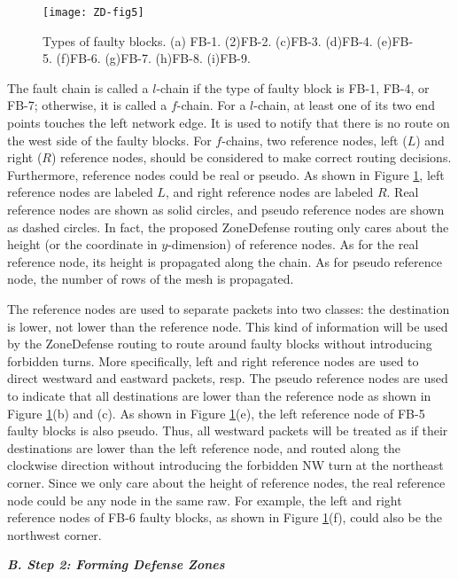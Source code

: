 \begin{figure}[h]
    \centering
        \texttt{[image: ZD-fig5]}
          \caption{Types of faulty blocks. (a) FB-1. (2)FB-2. (c)FB-3. (d)FB-4. (e)FB-5. (f)FB-6. (g)FB-7. (h)FB-8. (i)FB-9.}
        \label{fig:ZD-fig5}
\end{figure}


The fault chain is called a $l$-chain if the type of faulty block is FB-1, FB-4, or FB-7; otherwise, it is called a $f$-chain. For a $l$-chain, at least one of its two end points touches the left network edge. It is used to notify that there is no route on the west side of the faulty blocks. For $f$-chains, two reference nodes, left ($L$) and right ($R$) reference nodes, should be considered to make correct routing decisions. Furthermore, reference nodes could be real or pseudo. As shown in Figure \ref{fig:ZD-fig5}, left reference nodes are labeled $L$, and right reference nodes are labeled $R$. Real reference nodes are shown as solid circles, and pseudo reference nodes are shown as dashed circles. In fact, the proposed ZoneDefense routing only cares about the height (or the coordinate in $y$-dimension) of reference nodes. As for the real reference node, its height is propagated along the chain. As for pseudo reference node, the number of rows of the mesh is propagated.

The reference nodes are used to separate packets into two classes: the destination is {lower, not lower} than the reference node. This kind of information will be used by the ZoneDefense routing to route around faulty blocks without introducing forbidden turns. More specifically, left and right reference nodes are used to direct westward and eastward packets, resp. The pseudo reference nodes are used to indicate that all destinations are lower than the reference node as shown in Figure \ref{fig:ZD-fig5}(b) and (c). As shown in Figure \ref{fig:ZD-fig5}(e), the left reference node of FB-5 faulty blocks is also pseudo. Thus, all westward packets will be treated as if their destinations are lower than the left reference node, and routed along the clockwise direction without introducing the forbidden NW turn at the northeast corner. Since we only care about the height of reference nodes, the real reference node could be any node in the same raw. For example, the left and right reference nodes of FB-6 faulty blocks, as shown in Figure \ref{fig:ZD-fig5}(f), could also be the northwest corner.

\textbf\textit{B. Step 2: Forming Defense Zones}

